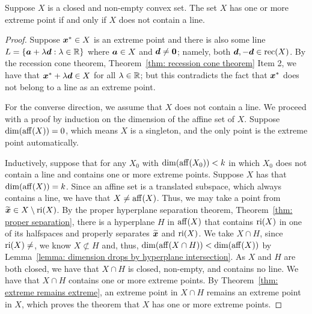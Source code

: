 \begin{theorem}\label{thm: extreme iff no line}
Suppose $X$ is a closed and non-empty convex set. The set $X$ has one or more extreme point if and only if $X$ does not contain a line. 
\end{theorem}
\begin{proof}
Suppose ${\boldsymbol x}^\ast \in X$ is an extreme point and there is also some line $L = \{{\boldsymbol a} + \lambda {\boldsymbol d}: \lambda\in \mathbb R\}$ where ${\boldsymbol a}\in X$ and ${\boldsymbol d}\neq \boldsymbol0$; namely, both ${\boldsymbol d}, -{\boldsymbol d}\in\operatorname{rec}(X)$. By the recession cone theorem, Theorem~\ref{thm: recession cone theorem} Item 2, we have that ${\boldsymbol x}^\ast + \lambda{\boldsymbol d}\in X$ for all $\lambda\in\mathbb R$; but this contradicts the fact that ${\boldsymbol x}^\ast$ does not belong to a line as an extreme point. 

For the converse direction, we assume that $X$ does not contain a line. We proceed with a proof by induction on the dimension of the affine set of $X$. Suppose $\dim(\operatorname{aff}(X)) = 0$, which means $X$ is a singleton, and the only point is the extreme point automatically. 

Inductively, suppose that for any $X_0$ with $\dim(\operatorname{aff}(X_0)) < k$ in which $X_0$ does not contain a line and contains one or more extreme points. Suppose $X$ has that $\dim(\operatorname{aff}(X)) = k$. Since an affine set is a translated subspace, which always contains a line, we have that $X\neq \operatorname{aff}(X)$. Thus, we may take a point from  $\widetilde{{\boldsymbol x}}\in X\setminus \operatorname{ri}(X)$. By the proper hyperplane separation theorem, Theorem~\ref{thm: proper separation}, there is a hyperplane $H$ in $\operatorname{aff}(X)$ that contains $\operatorname{ri}(X)$ in one of its halfspaces and properly separates $\widetilde{{\boldsymbol x}}$ and $\operatorname{ri}(X)$. We take $X\cap H$, since $\ri(X)\neq\empty$, we know $X\not\subset H$ and, thus, $\dim(\operatorname{aff}(X\cap H))< \dim(\operatorname{aff}(X))$ by Lemma~\ref{lemma: dimension drops by hyperplane intersection}. As $X$ and $H$ are both closed, we have that $X\cap H$ is closed, non-empty, and contains no line. We have that $X\cap H$ contains one or more extreme points. By Theorem~\ref{thm: extreme remains extreme}, an extreme point in $X\cap H$ remains an extreme point in $X$, which proves the theorem that $X$ has one or more extreme points. 
\end{proof}


